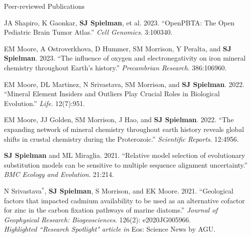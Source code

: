 \documentclass{resume} %
\begin{document}
\vspace*{0.35cm}
\begin{rSection}{Peer-reviewed Publications}
\vspace*{0.25cm}

\begin{etaremune}[leftmargin=1.5em]


\item JA Shapiro, K Gaonkar, \textbf{SJ Spielman}, et al. 2023. ``OpenPBTA: The Open Pediatric Brain Tumor Atlas.'' \emph{Cell Genomics}. 3:100340.

\item EM Moore, A Ostroverkhova, D Hummer, SM Morrison, Y Peralta, and \textbf{SJ Spielman}. 2023. ``The influence of oxygen and electronegativity on iron mineral chemistry throughout Earth’s history.'' \emph{Precambrian Research}. 386:106960.

\item EM Moore, DL Martinez, N Srivastava, SM Morrison, and \textbf{SJ Spielman}. 2022. ``Mineral Element Insiders and Outliers Play Crucial Roles in Biological Evolution.'' \emph{Life}. 12(7):951.

\item EM Moore, JJ Golden, SM Morrison, J Hao, and \textbf{SJ Spielman}. 2022. ``The expanding network of mineral chemistry throughout earth history reveals global shifts in crustal chemistry during the Proterozoic.'' \emph{Scientific Reports}. 12:4956.

\item \textbf{SJ Spielman} and ML Miraglia. 2021. ``Relative model selection of evolutionary substitution models can be sensitive to multiple sequence alignment uncertainty.'' \emph{BMC Ecology and Evolution}. 21:214.

\item N Srivastava$^\ast$, \textbf{SJ Spielman}, S Morrison, and EK Moore. 2021. ``Geological factors that impacted cadmium availability to be used as an alternative cofactor for zinc in the carbon fixation pathways of marine diatoms.'' \emph{Journal of Geophysical Research: Biogeosciences}. 126(2): e2020JG005966. \\
\emph{Highlighted ``Research Spotlight" article in} Eos: Science News by AGU.


\end{etaremune}
\end{rSection}
\end{document}
